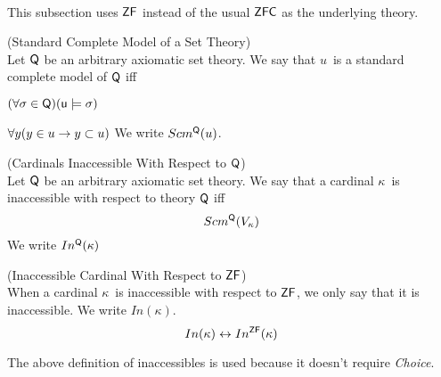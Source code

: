 
\

This subsection uses $\sf{ZF}$ instead of the usual $\sf{ZFC}$ as the underlying theory. %

\begin{definition}{(Standard Complete Model of a Set Theory)}\label{def:scm_q}\\
Let $\sf{Q}$ be an arbitrary axiomatic set theory.
We say that $u$ is a standard complete model of $\sf{Q}$ iff
\bce[(i)]
\item $(\forall \sigma \in \sf{Q})(u \models \sigma)$
\item $\forall y (y \in u \then y \subset u)$
\ece 
We write $Scm^{\sf{Q}}(u)$.
\end{definition}

\begin{definition}{(Cardinals Inaccessible With Respect to $\sf{Q}$)}\label{def:levy_inaccessible_q}\\
Let $\sf{Q}$ be an arbitrary axiomatic set theory. We say that a cardinal $\kappa$ is inaccessible with respect to theory $\sf{Q}$ iff
\begin{equation}
Scm^{\sf{Q}}(V_\kappa)
\end{equation}
We write $In^{\sf{Q}}(\kappa)$
\end{definition}

\begin{definition}{(Inaccessible Cardinal With Respect to $\sf{ZF}$)}\label{def:levy_inaccessible}\\
When a cardinal $\kappa$ is inaccessible with respect to $\sf{ZF}$, we only say that it is inaccessible. We write $In(\kappa)$.
\begin{equation}
In(\kappa) \iff In^{\sf{ZF}}(\kappa)
\end{equation}
\end{definition}
The above definition of inaccessibles is used because it doesn't require \emph{Choice}.

